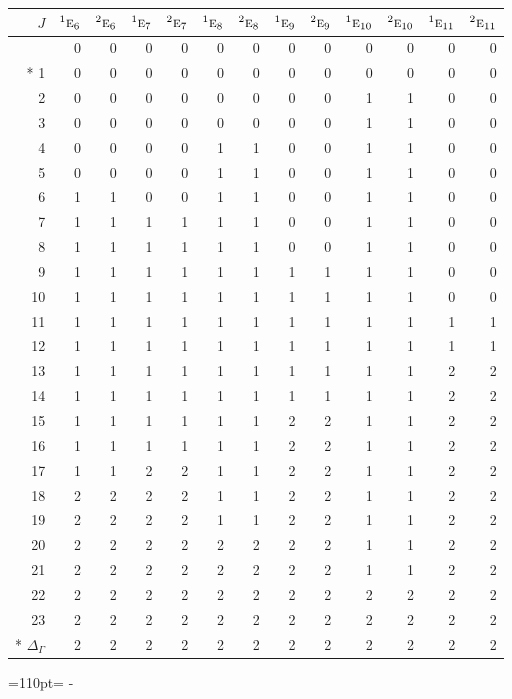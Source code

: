 \documentclass[10pt,a4paper]{article}
\makeatletter
\def\grouprule#1#2{\noalign{\marks\LTgroupmarks{\the\belowrulesep}\nobreak\vskip#1%
  \vskip\aboverulesep}\multispan\LT@cols\unskip{\leaders\hrule\@height#2\hfill\kern\z@}\cr
  \noalign{\penalty\LTrulebreak\vskip\belowrulesep\global\@lastruleclass\z@}}
\newcommand{\needspace}[1]{\par\penalty-100\begingroup\dimen0=#1\relax\dimen2=\pagegoal
  \advance\dimen2-\pagetotal\ifdim\dimen0>\dimen2\relax\ifdim\dimen2>0pt\vfil\break\fi\fi
  \endgroup}
\numberwithin{equation}{section}
\newcommand{\irr}[1]{\text{\normalfont\scshape #1}}
\newcommand{\conjpair}[1]{{}^{#1}}
\makeatother
\begin{document}
{\small\begin{longtable}{@{}rrrrrrrrrrrrr@{}}\toprule
$J$ & $\conjpair{1}\irr{e}_{6}$ & $\conjpair{2}\irr{e}_{6}$ & $\conjpair{1}\irr{e}_{7}$ & $\conjpair{2}\irr{e}_{7}$ & $\conjpair{1}\irr{e}_{8}$ & $\conjpair{2}\irr{e}_{8}$ & $\conjpair{1}\irr{e}_{9}$ & $\conjpair{2}\irr{e}_{9}$ & $\conjpair{1}\irr{e}_{10}$ & $\conjpair{2}\irr{e}_{10}$ & $\conjpair{1}\irr{e}_{11}$ & $\conjpair{2}\irr{e}_{11}$\\\midrule\endhead
\bottomrule\endfoot\endlastfoot
0 & 0 & 0 & 0 & 0 & 0 & 0 & 0 & 0 & 0 & 0 & 0 & 0\\*
1 & 0 & 0 & 0 & 0 & 0 & 0 & 0 & 0 & 0 & 0 & 0 & 0\\
2 & 0 & 0 & 0 & 0 & 0 & 0 & 0 & 0 & 1 & 1 & 0 & 0\\
3 & 0 & 0 & 0 & 0 & 0 & 0 & 0 & 0 & 1 & 1 & 0 & 0\\
4 & 0 & 0 & 0 & 0 & 1 & 1 & 0 & 0 & 1 & 1 & 0 & 0\\
5 & 0 & 0 & 0 & 0 & 1 & 1 & 0 & 0 & 1 & 1 & 0 & 0\\
6 & 1 & 1 & 0 & 0 & 1 & 1 & 0 & 0 & 1 & 1 & 0 & 0\\
7 & 1 & 1 & 1 & 1 & 1 & 1 & 0 & 0 & 1 & 1 & 0 & 0\\
8 & 1 & 1 & 1 & 1 & 1 & 1 & 0 & 0 & 1 & 1 & 0 & 0\\
9 & 1 & 1 & 1 & 1 & 1 & 1 & 1 & 1 & 1 & 1 & 0 & 0\\
10 & 1 & 1 & 1 & 1 & 1 & 1 & 1 & 1 & 1 & 1 & 0 & 0\\
11 & 1 & 1 & 1 & 1 & 1 & 1 & 1 & 1 & 1 & 1 & 1 & 1\\
12 & 1 & 1 & 1 & 1 & 1 & 1 & 1 & 1 & 1 & 1 & 1 & 1\\
13 & 1 & 1 & 1 & 1 & 1 & 1 & 1 & 1 & 1 & 1 & 2 & 2\\
14 & 1 & 1 & 1 & 1 & 1 & 1 & 1 & 1 & 1 & 1 & 2 & 2\\
15 & 1 & 1 & 1 & 1 & 1 & 1 & 2 & 2 & 1 & 1 & 2 & 2\\
16 & 1 & 1 & 1 & 1 & 1 & 1 & 2 & 2 & 1 & 1 & 2 & 2\\
17 & 1 & 1 & 2 & 2 & 1 & 1 & 2 & 2 & 1 & 1 & 2 & 2\\
18 & 2 & 2 & 2 & 2 & 1 & 1 & 2 & 2 & 1 & 1 & 2 & 2\\
19 & 2 & 2 & 2 & 2 & 1 & 1 & 2 & 2 & 1 & 1 & 2 & 2\\
20 & 2 & 2 & 2 & 2 & 2 & 2 & 2 & 2 & 1 & 1 & 2 & 2\\
21 & 2 & 2 & 2 & 2 & 2 & 2 & 2 & 2 & 1 & 1 & 2 & 2\\
22 & 2 & 2 & 2 & 2 & 2 & 2 & 2 & 2 & 2 & 2 & 2 & 2\\
23 & 2 & 2 & 2 & 2 & 2 & 2 & 2 & 2 & 2 & 2 & 2 & 2\\*
\grouprule{0pt}{\lightrulewidth} $\Delta_\Gamma$ & 2 & 2 & 2 & 2 & 2 & 2 & 2 & 2 & 2 & 2 & 2 & 2\\
\bottomrule\end{longtable}}
\needspace{110pt}
\end{document}

